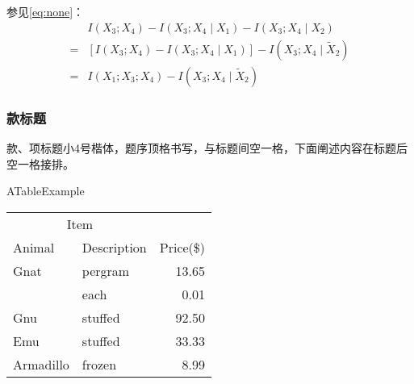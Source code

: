 \zhlipsum[1-3][name=simp]

参见\cref{eq:none}：
\begin{align}
\label{eq:none}
&I(X_3;X_4)-I(X_3;X_4\mid{}X_1)-I(X_3;X_4\mid{}X_2)\nonumber\\
=&[I(X_3;X_4)-I(X_3;X_4\mid{}X_1)]-I(X_3;X_4\mid{}\tilde{X}_2)\\
=&I(X_1;X_3;X_4)-I(X_3;X_4\mid{}\tilde{X}_2)
\end{align}
\zhlipsum[6-8][name=simp]


\zhlipsum[2-3][name=simp]

\begin{figure}[!htp]
	\centering
	\resizebox{10cm}{!}{}
	\label{fig:flow_chart}
\end{figure}

\zhlipsum[1-3][name=simp]

\subsubsection{款标题}
款、项标题小4号楷体，题序顶格书写，与标题间空一格，下面阐述内容在标题后空一格接排。

\begin{table}[!hpb]
	\centering
	{ATableExample}
	\label{tab:firstone}
	\begin{tabular}{@{}llr@{}}\toprule
		\multicolumn{2}{c}{Item}\\\cmidrule(r){1-2}
		Animal&Description&Price(\$)\\\midrule
		Gnat&pergram&13.65\\
		&each&0.01\\
		Gnu&stuffed&92.50\\
		Emu&stuffed&33.33\\
		Armadillo&frozen&8.99\\\bottomrule
	\end{tabular}
\end{table}

